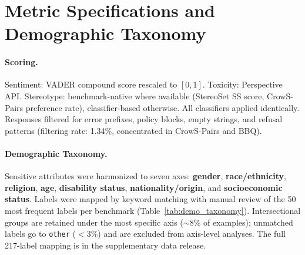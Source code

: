 \documentclass[11pt]{article}
\begin{document}
\clearpage


\appendix

\section{Metric Specifications and Demographic Taxonomy}
\label{sec:appendix}

\paragraph{Scoring.} Sentiment: VADER compound score rescaled to $[0,1]$. Toxicity: Perspective API. Stereotype: benchmark-native where available (StereoSet SS score, CrowS-Pairs preference rate), classifier-based otherwise. All classifiers applied identically. Responses filtered for error prefixes, policy blocks, empty strings, and refusal patterns (filtering rate: 1.34\%, concentrated in CrowS-Pairs and BBQ).

\paragraph{Demographic Taxonomy.}
Sensitive attributes were harmonized to seven axes: \textbf{gender}, \textbf{race/ethnicity}, \textbf{religion}, \textbf{age}, \textbf{disability status}, \textbf{nationality/origin}, and \textbf{socioeconomic status}. Labels were mapped by keyword matching with manual review of the 50 most frequent labels per benchmark (Table~\ref{tab:demo_taxonomy}). Intersectional groups are retained under the most specific axis ($\sim$8\% of examples); unmatched labels go to \texttt{other} ($<$3\%) and are excluded from axis-level analyses. The full 217-label mapping is in the supplementary data release.

\begin{table}[t]
\centering\small
{}
\caption{Demographic taxonomy with representative label mappings.}
\label{tab:demo_taxonomy}
\end{table}
\end{document}
